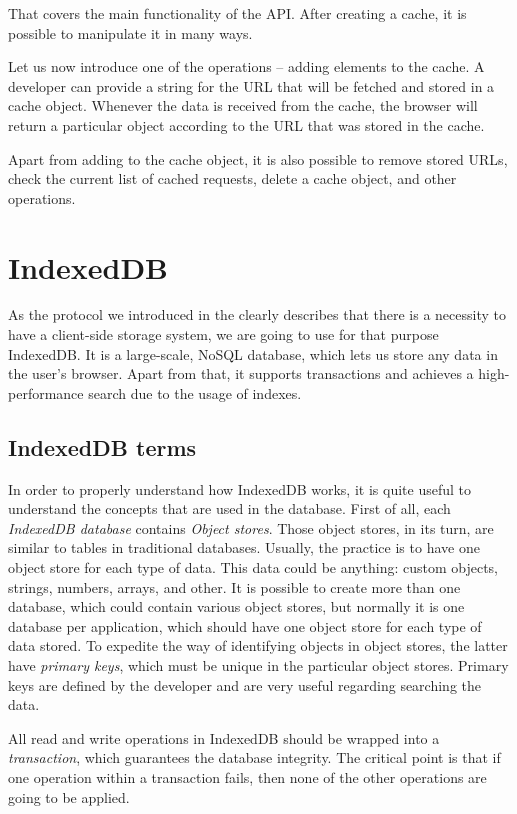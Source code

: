 That covers the main functionality of the API. After creating a cache, it is possible to manipulate it in many ways. 

Let us now introduce one of the operations -- adding elements to the cache. A developer can provide a string for the URL that will be fetched and stored in a cache object. Whenever the data is received from the cache, the browser will return a particular object according to the URL that was stored in the cache. 

Apart from adding to the cache object, it is also possible to remove stored URLs, check the current list of cached requests, delete a cache object, and other operations.

\section{IndexedDB}

As the protocol we introduced in the  clearly describes that there is a necessity to have a client-side storage system, we are going to use for that purpose IndexedDB\cite{35}. It is a large-scale, NoSQL database, which lets us store any data in the user's browser. Apart from that, it supports transactions and achieves a high-performance search due to the usage of indexes. 

\subsection{IndexedDB terms}

In order to properly understand how IndexedDB works, it is quite useful to understand the concepts that are used in the database. First of all, each \textit{IndexedDB database} contains \textit{Object stores}. Those object stores, in its turn, are similar to tables in traditional databases. Usually, the practice is to have one object store for each type of data. This data could be anything: custom objects, strings, numbers, arrays, and other. It is possible to create more than one database, which could contain various object stores, but normally it is one database per application, which should have one object store for each type of data stored. To expedite the way of identifying objects in object stores, the latter have \textit{primary keys}, which must be unique in the particular object stores. Primary keys are defined by the developer and are very useful regarding searching the data.

All read and write operations in IndexedDB should be wrapped into a \textit{transaction}, which guarantees the database integrity. The critical point is that if one operation within a transaction fails, then none of the other operations are going to be applied. 

